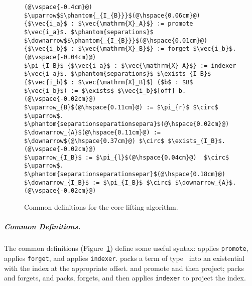 \begin{figure}
\begin{lstlisting}
(@\vspace{-0.4cm}@)
$\uparrow$$\phantom{_{I_{B}}}$(@\hspace{0.06cm}@) {$\vec{i_a}$ : $\vec{\mathrm{X}_A}$} := promote $\vec{i_a}$. $\phantom{separations}$ $\downarrow$$\phantom{_{I_{B}}}$(@\hspace{0.01cm}@) {$\vec{i_b}$ : $\vec{\mathrm{X}_B}$} := forget $\vec{i_b}$.(@\vspace{-0.04cm}@)
$\pi_{I_B}$ {$\vec{i_a}$ : $\vec{\mathrm{X}_A}$} := indexer $\vec{i_a}$. $\phantom{separations}$ $\exists_{I_B}$ {$\vec{i_b}$ : $\vec{\mathrm{X}_B}$} ($b$ : $B$ $\vec{i_b}$) := $\exists$ $\vec{i_b}$[off] b.(@\vspace{-0.02cm}@)
$\uparrow_{B}$(@\hspace{0.11cm}@) := $\pi_{r}$ $\circ$ $\uparrow$. $\phantom{separationseparationsepara}$(@\hspace{0.02cm}@) $\downarrow_{A}$(@\hspace{0.11cm}@) := $\downarrow$(@\hspace{0.37cm}@) $\circ$ $\exists_{I_B}$.(@\vspace{-0.02cm}@)
$\uparrow_{I_B}$ := $\pi_{l}$(@\hspace{0.04cm}@)  $\circ$ $\uparrow$. $\phantom{separationseparationsepar}$(@\hspace{0.18cm}@) $\downarrow_{I_B}$ := $\pi_{I_B}$ $\circ$ $\downarrow_{A}$.(@\vspace{-0.02cm}@)
\end{lstlisting}
\vspace{-0.3cm}
\caption{Common definitions for the core lifting algorithm.}
\label{fig:convenience}
\end{figure}

\subparagraph*{Common Definitions.} The common definitions (Figure~\ref{fig:convenience}) %
define some useful syntax:
\smallmath{$\uparrow$} applies \lstinline{promote}, \smallmath{$\downarrow$} applies
\lstinline{forget}, and  applies \lstinline{indexer}.
 packs a term of type \B\
into an existential with the index at the appropriate offset.  and  promote and then project;
\smallmath{$\downarrow_{A}$} packs and forgets, and \smallmath{$\downarrow_{I_B}$} packs, forgets, and then 
applies \lstinline{indexer} to project the index.


